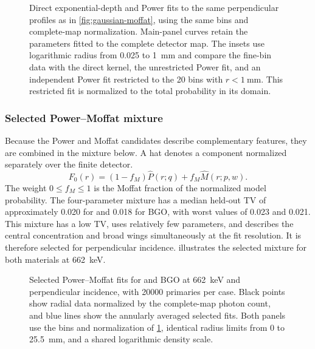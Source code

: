 \begin{figure}[!htbp]
  \centering
  \captionsetup{font=small}
  \caption{Direct exponential-depth and Power fits to the same perpendicular  profiles as in \cref{fig:gaussian-moffat}, using the same bins and complete-map normalization. Main-panel curves retain the parameters fitted to the complete  detector map. The insets use logarithmic radius from 0.025 to \qty{1}{\milli\metre} and compare the fine-bin data with the direct kernel, the unrestricted Power fit, and an independent Power fit restricted to the 20 bins with $r<\qty{1}{\milli\metre}$. This restricted fit is normalized to the total probability in its domain.}
  \label{fig:perpendicular-models}
\end{figure}
\FloatBarrier

\subsubsection{Selected Power--Moffat mixture}

Because the Power and Moffat candidates describe complementary features, they are combined in the mixture below. A hat denotes a component normalized separately over the finite detector.
\begin{equation}
  F_0(r)=(1-f_M)\widehat P(r;q)+f_M\widehat M(r;p,w).
\end{equation}
The weight $0\leq f_M\leq1$ is the Moffat fraction of the normalized model probability. The four-parameter mixture has a median held-out TV of approximately 0.020 for  and 0.018 for BGO, with worst values of 0.023 and 0.021.
This mixture has a low TV, uses relatively few parameters, and describes the central concentration and broad wings simultaneously at the  fit resolution. It is therefore selected for perpendicular incidence.  illustrates the selected mixture for both materials at \qty{662}{\kilo\electronvolt}.

\begin{figure}[H]
  \centering
  \captionsetup{font=small}
  \caption{Selected Power--Moffat fits for  and BGO at \qty{662}{\kilo\electronvolt} and perpendicular incidence, with \num{20000} primaries per case. Black points show radial data normalized by the complete-map photon count, and blue lines show the annularly averaged selected fits. Both panels use the bins and normalization of \cref{fig:perpendicular-models}, identical radius limits from 0 to \qty{25.5}{\milli\metre}, and a shared logarithmic density scale.}
  \label{fig:selected-perpendicular-fit}
\end{figure}

